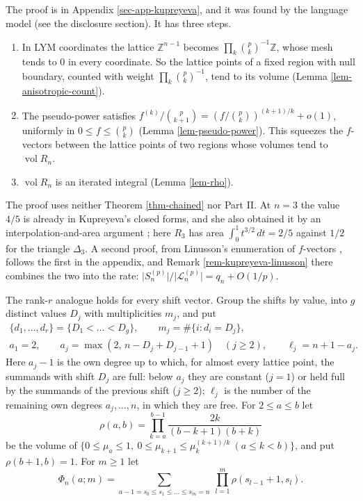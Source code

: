 \documentclass[11pt, a4paper, abstract=yes]{scrartcl}
\theoremstyle{definition}
\theoremstyle{remark}
\theoremstyle{plain}
\theoremstyle{remark}
\theoremstyle{plain}
\newcommand{\vol}{\operatorname{vol}}
\begin{document}
The proof is in Appendix \ref{sec-app-kupreyeva}, and it was found by the language model (see the
disclosure section). It has three steps.
\begin{enumerate}
\item In LYM coordinates the lattice \(\mathbb Z^{n-1}\) becomes \(\prod_k\binom pk^{-1}\mathbb Z\),
whose mesh tends to \(0\) in every coordinate. So the lattice points of a fixed region with null
boundary, counted with weight \(\prod_k\binom pk^{-1}\), tend to its volume
(Lemma \ref{lem-anisotropic-count}).
\item The pseudo-power satisfies \(f^{(k)}/\binom p{k+1}=(f/\binom pk)^{(k+1)/k}+o(1)\), uniformly in
\(0\le f\le\binom pk\) (Lemma \ref{lem-pseudo-power}). This squeezes the \(f\)-vectors between the
lattice points of two regions whose volumes tend to \(\vol R_n\).
\item \(\vol R_n\) is an iterated integral (Lemma \ref{lem-rho}).
\end{enumerate}

The proof uses neither Theorem \ref{thm-chained} nor Part II. At \(n=3\) the value \(4/5\) is already
in Kupreyeva's closed forms, and she also obtained it by an interpolation-and-area argument
\autocite[Section 4.1]{Kupreyeva2019}; here \(R_3\) has area \(\int_0^1t^{3/2}\,dt=2/5\) against \(1/2\) for
the triangle \(\Delta_3\). A second proof, from Linusson's enumeration of \(f\)-vectors
\autocite{Linusson1999}, follows the first in the appendix, and Remark \ref{rem-kupreyeva-linusson} there
combines the two into the rate: \(\lvert S_n^{(p)}\rvert/\lvert\mathcal L_n^{(p)}\rvert=q_n+O(1/p)\).

The rank-\(r\) analogue holds for every shift vector. Group the shifts by value, into \(g\)
distinct values \(D_j\) with multiplicities \(m_j\), and put
\begin{equation}\label{eq:aj}
\begin{gathered}
  \lbrace d_1,\dots,d_r\rbrace=\lbrace D_1<\dots<D_g\rbrace,\qquad m_j=\#\lbrace i:d_i=D_j\rbrace,\\
  a_1=2,\qquad a_j=\max(2,\,n-D_j+D_{j-1}+1)\quad(j\ge2),\qquad \ell_j=n+1-a_j .
\end{gathered}
\end{equation}
Here \(a_j-1\) is the own degree up to which, for almost every lattice point, the summands with shift
\(D_j\) are full: below \(a_j\) they are constant (\(j=1\)) or held full by the summands of the
previous shift (\(j\ge2\)); \(\ell_j\) is the number of the remaining own degrees
\(a_j,\dots,n\), in which they are free. For \(2\le a\le b\) let
\begin{equation}\label{eq:rho}
  \rho(a,b)=\prod_{k=a}^{b-1}\frac{2k}{(b-k+1)(b+k)}
\end{equation}
be the volume of \(\lbrace0\le\mu_a\le1,\ 0\le\mu_{k+1}\le\mu_k^{(k+1)/k}\ (a\le k<b)\rbrace\), and
put \(\rho(b+1,b)=1\). For \(m\ge1\) let
\begin{equation}\label{eq:Phi}
  \Phi_n(a;m)=\sum_{a-1=s_0\le s_1\le\dots\le s_m=n}\ \prod_{l=1}^m\rho(s_{l-1}+1,s_l) .
\end{equation}
\end{document}
